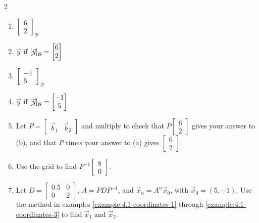 \documentclass[11pt, letterpaper]{report}
\let\originalleft\left
\let\originalright\right
\renewcommand{\left}{\mathopen{}\mathclose\bgroup\originalleft}
\renewcommand{\right}{\aftergroup\egroup\originalright}
\newcounter{example}[section]
\newcommand{\bbvec}[2]{
  \begin{bmatrix} #1 \\ #2 \end{bmatrix}
}
\newcommand{\vectorgrid}[1][]{%
  \pgfkeys{/vectorgrid/.cd, #1}%
  \clip (\vgxmin,\vgymin) rectangle (\vgxmax,\vgymax);

  \draw[step=\vgstep cm, gray, very thin] (\vgxmin,\vgymin) grid (\vgxmax,\vgymax);

  \draw[-] (\vgxmin,0) -- (\vgxmax,0);%
  \draw[-] (0,\vgymin) -- (0,\vgymax);%

  \pgfmathsetmacro{\bignum}{50}

  \foreach \k in {-20,...,20} {
    \pgfmathsetmacro{\px}{\k*\vgxv}
    \pgfmathsetmacro{\py}{\k*\vgyv}
    \pgfmathparse{abs(\px) <= abs(\vgxmax)*2+abs(\vgxmin)*2 && abs(\py) <= abs(\vgymax)*2+abs(\vgymin)*2 ? 1 : 0}
    \ifnum\pgfmathresult=1
      \draw[blue, very thin] ($(\px,\py) - \bignum*(\vgxu,\vgyu)$) -- ($(\px,\py) + \bignum*(\vgxu,\vgyu)$);
    \fi
  }

  \foreach \k in {-20,...,20} {
    \pgfmathsetmacro{\px}{\k*\vgxu}
    \pgfmathsetmacro{\py}{\k*\vgyu}
    \pgfmathparse{abs(\px) <= abs(\vgxmax)*2+abs(\vgxmin)*2 && abs(\py) <= abs(\vgymax)*2+abs(\vgymin)*2 ? 1 : 0}
    \ifnum\pgfmathresult=1
      \draw[blue, very thin] ($(\px,\py) - \bignum*(\vgxv,\vgyv)$) -- ($(\px,\py) + \bignum*(\vgxv,\vgyv)$);
    \fi
  }

  \draw[-Stealth, very thick, blue] (0,0) -- (\vgxu,\vgyu);%
  \draw[-Stealth, very thick, blue] (0,0) -- (\vgxv,\vgyv);%

  \pgfmathtruncatemacro{\intxmin}{ceil(\vgxmin)}
  \pgfmathtruncatemacro{\intxmax}{floor(\vgxmax)}
  \foreach \x in {\intxmin,...,\intxmax} {
    \pgfmathparse{mod(\x,\vglabint) == 0 && \x != 0 && \x != \vgxmin && \x != \vgxmax ? 1 : 0}
    \ifnum\pgfmathresult=1
      \draw (\x,0.1) -- (\x,-0.1) node[anchor=north,fill=white,inner sep=1pt] {\small$\x$};
    \fi
  }

  \pgfmathtruncatemacro{\intymin}{ceil(\vgymin)}
  \pgfmathtruncatemacro{\intymax}{floor(\vgymax)}
  \foreach \y in {\intymin,...,\intymax} {
    \pgfmathparse{mod(\y,\vglabint) == 0 && \y != 0 && \y != \vgymin && \y != \vgymax ? 1 : 0}
    \ifnum\pgfmathresult=1
      \draw (0.1,\y) -- (-0.1,\y) node[anchor=east,fill=white,inner sep=1pt] {\small$\y$};
    \fi
  }
}
\begin{document}
\begin{multicols*}{2}
\begin{enumerate}[label=(\alph*)]
\item $ \bbvec{6}{2}_{\mathcal{B}}$
\item $\vec{y}$ if $\left[ \vec{y} \right]_{\mathcal{B}} = \bbvec{6}{2}$
\item $\bbvec{-1}{5}_{\mathcal{B}}$
\item $\vec{y}$ if $\left[ \vec{y} \right]_{\mathcal{B}} = \bbvec{-1}{5}$
\item Let $P=\begin{bmatrix}
\vec{b}_1 & \vec{b}_2
\end{bmatrix}$ and multiply to check that $P \bbvec{6}{2}$ gives your answer to (b), and that $P$ times your answer to (a) gives $\bbvec{6}{2}$.
\item Use the grid to find $P^{-1}\bbvec{8}{0}$.
\item Let $D = \begin{bmatrix}
0.5 & 0 \\
0 & 2
\end{bmatrix}$, $A = PDP^{-1}$, and $\vec{x}_n=A^n\vec{x}_0$, with $\vec{x}_0=(5,-1)$. Use the method in examples \ref{example:4.1-coordinates-1} through \ref{example:4.1-coordinates-3} to find $\vec{x}_1$ and $\vec{x}_2$.
\end{enumerate}



\end{multicols*}
\end{document}
